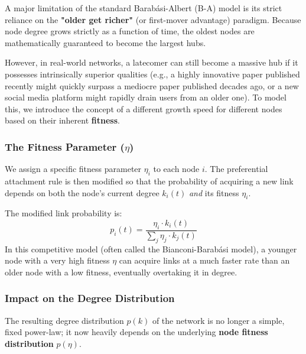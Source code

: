 A major limitation of the standard Barabási-Albert (B-A) model is its strict reliance on the \textbf{"older get richer"} (or first-mover advantage) paradigm. Because node degree grows strictly as a function of time, the oldest nodes are mathematically guaranteed to become the largest hubs.

However, in real-world networks, a latecomer can still become a massive hub if it possesses intrinsically superior qualities (e.g., a highly innovative paper published recently might quickly surpass a mediocre paper published decades ago, or a new social media platform might rapidly drain users from an older one). To model this, we introduce the concept of a different growth speed for different nodes based on their inherent \textbf{fitness}.

\subsubsection{The Fitness Parameter (\( \eta \))}

We assign a specific fitness parameter \( \eta_i \) to each node \( i \). The preferential attachment rule is then modified so that the probability of acquiring a new link depends on both the node's current degree \( k_i(t) \) \textit{and} its fitness \( \eta_i \).

The modified link probability is:
\[
    p_i(t) = \frac{\eta_i \cdot k_i(t)}{\sum_j \eta_j \cdot k_j(t)}
\]
In this competitive model (often called the Bianconi-Barabási model), a younger node with a very high fitness \( \eta \) can acquire links at a much faster rate than an older node with a low fitness, eventually overtaking it in degree.

\subsubsection{Impact on the Degree Distribution}

The resulting degree distribution \( p(k) \) of the network is no longer a simple, fixed power-law; it now heavily depends on the underlying \textbf{node fitness distribution} \( p(\eta) \).

